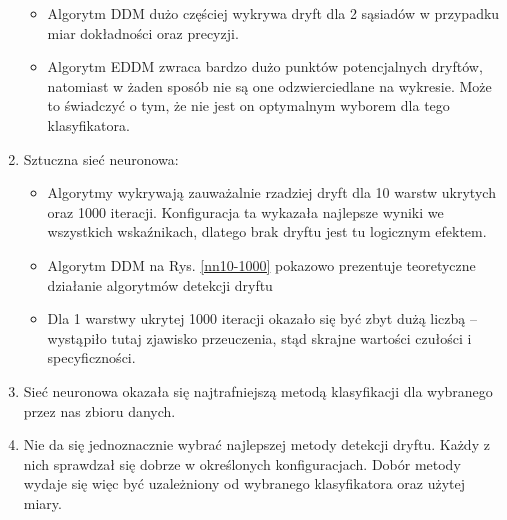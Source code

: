 \documentclass{classrep}
\begin{document}
\begin{enumerate}
\begin{itemize}
        \item Algorytm DDM dużo częściej wykrywa dryft dla 2 sąsiadów w przypadku miar dokładności oraz precyzji.
        \item Algorytm EDDM zwraca bardzo dużo punktów potencjalnych dryftów, natomiast w żaden sposób nie są one odzwierciedlane na wykresie. Może to świadczyć o tym, że nie jest on optymalnym wyborem dla tego klasyfikatora.
    \end{itemize}
    \item Sztuczna sieć neuronowa:
    \begin{itemize}
        \item Algorytmy wykrywają zauważalnie rzadziej dryft dla 10 warstw ukrytych oraz 1000 iteracji. Konfiguracja ta wykazała najlepsze wyniki we wszystkich wskaźnikach, dlatego brak dryftu jest tu logicznym efektem.
        \item Algorytm DDM na Rys. \ref{nn10-1000} pokazowo prezentuje teoretyczne działanie algorytmów detekcji dryftu
        \item Dla 1 warstwy ukrytej 1000 iteracji okazało się być zbyt dużą liczbą -- wystąpiło tutaj zjawisko przeuczenia, stąd skrajne wartości czułości i specyficzności. 
    \end{itemize}
    \item Sieć neuronowa okazała się najtrafniejszą metodą klasyfikacji dla wybranego przez nas zbioru danych.
    \item Nie da się jednoznacznie wybrać najlepszej metody detekcji dryftu. Każdy z nich sprawdzał się dobrze w określonych konfiguracjach. Dobór metody wydaje się więc być uzależniony od wybranego klasyfikatora oraz użytej miary.
   
\end{enumerate}

\end{document}
